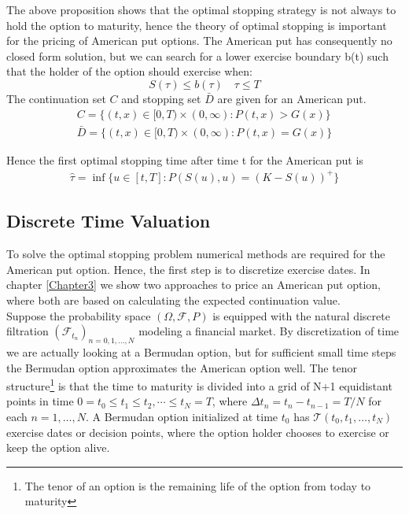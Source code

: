 The above proposition shows that the optimal stopping strategy is not always to hold the option to maturity, hence the theory of optimal stopping is important for the pricing of American put options. The American put has consequently no closed form solution, but we can search for a lower exercise boundary b(t) such that the holder of the option should exercise when:
$$S(\tau)\leq b(\tau) \quad \tau \leq T$$
The continuation set $C$ and stopping set $\bar{D}$ are given for an American put.
\begin{align*}
C=\{(t,x) \in [0,T) \times (0,\infty) : P(t,x) > G(x) \}\\
\bar{D}=\{(t,x) \in [0,T) \times (0,\infty) : P(t,x) = G(x) \}
\end{align*} 

Hence the first optimal stopping time after time t for the American put is
\begin{equation*}
\begin{split}
\hat{\tau}= \inf\{u \in [t,T] : P(S(u),u) = (K-S(u))^+ \}
\end{split}
\end{equation*}

\subsection{Discrete Time Valuation}\label{DiscreteValueFramework}
To solve the optimal stopping problem numerical methods are required for the American put option. Hence, the first step is to discretize exercise dates. In chapter \ref{Chapter3} we show two approaches to price an American put option, where both are based on calculating the expected continuation value. \\

Suppose the probability space $(\Omega, \mathcal{F}, P)$ is equipped with the natural discrete filtration $(\mathcal{F}_{t_n})_{n=0,1,\ldots,N}$ modeling a financial market. By discretization of time we are actually looking at a Bermudan option, but for sufficient small time steps the Bermudan option approximates the American option well. The tenor structure\footnote{The tenor of an option is the remaining life of the option from today to maturity} is that the time to maturity is divided into a grid of N+1 equidistant points in time $0=t_0\leq t_1\leq t_2, \cdots \leq t_N=T$, where $\Delta t_n = t_n-t_{n-1}=T/N$ for each $n=1, \ldots, N$. A Bermudan option initialized at time $t_0$ has $\mathcal{T}(t_0,t_1,\ldots,t_N)$ exercise dates or decision points, where the option holder chooses to exercise or keep the option alive. \\

